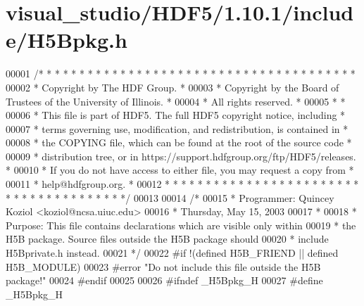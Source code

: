 \hypertarget{visual__studio_2_h_d_f5_21_810_81_2include_2_h5_bpkg_8h_source}{}\section{visual\+\_\+studio/\+H\+D\+F5/1.10.1/include/\+H5\+Bpkg.h}
\label{visual__studio_2_h_d_f5_21_810_81_2include_2_h5_bpkg_8h_source}

\begin{DoxyCode}
00001 \textcolor{comment}{/* * * * * * * * * * * * * * * * * * * * * * * * * * * * * * * * * * * * * * *}
00002 \textcolor{comment}{ * Copyright by The HDF Group.                                               *}
00003 \textcolor{comment}{ * Copyright by the Board of Trustees of the University of Illinois.         *}
00004 \textcolor{comment}{ * All rights reserved.                                                      *}
00005 \textcolor{comment}{ *                                                                           *}
00006 \textcolor{comment}{ * This file is part of HDF5.  The full HDF5 copyright notice, including     *}
00007 \textcolor{comment}{ * terms governing use, modification, and redistribution, is contained in    *}
00008 \textcolor{comment}{ * the COPYING file, which can be found at the root of the source code       *}
00009 \textcolor{comment}{ * distribution tree, or in https://support.hdfgroup.org/ftp/HDF5/releases.  *}
00010 \textcolor{comment}{ * If you do not have access to either file, you may request a copy from     *}
00011 \textcolor{comment}{ * help@hdfgroup.org.                                                        *}
00012 \textcolor{comment}{ * * * * * * * * * * * * * * * * * * * * * * * * * * * * * * * * * * * * * * */}
00013 
00014 \textcolor{comment}{/*}
00015 \textcolor{comment}{ * Programmer:  Quincey Koziol <koziol@ncsa.uiuc.edu>}
00016 \textcolor{comment}{ *      Thursday, May 15, 2003}
00017 \textcolor{comment}{ *}
00018 \textcolor{comment}{ * Purpose: This file contains declarations which are visible only within}
00019 \textcolor{comment}{ *      the H5B package.  Source files outside the H5B package should}
00020 \textcolor{comment}{ *      include H5Bprivate.h instead.}
00021 \textcolor{comment}{ */}
00022 \textcolor{preprocessor}{#if !(defined H5B\_FRIEND || defined H5B\_MODULE)}
00023 \textcolor{preprocessor}{#error "Do not include this file outside the H5B package!"}
00024 \textcolor{preprocessor}{#endif}
00025 
00026 \textcolor{preprocessor}{#ifndef \_H5Bpkg\_H}
00027 \textcolor{preprocessor}{#define \_H5Bpkg\_H}

\end{DoxyCode}
